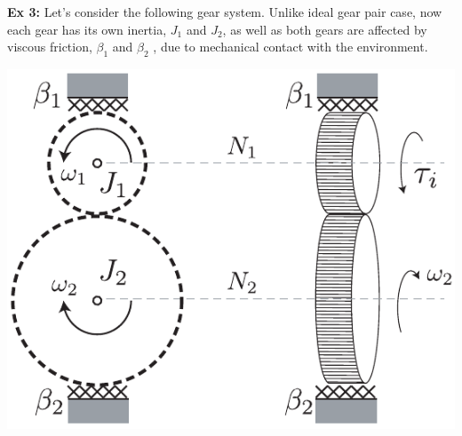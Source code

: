 \documentclass[twoside]{article}
\begin{document}
\vspace{12pt}

\textbf{Ex 3:} Let's consider the following gear system. Unlike ideal gear pair case, now each gear has its own inertia, $J_1$ and
$J_2$, as well as both gears are affected by viscous friction, $\beta_1$ and $\beta_2$ , due to mechanical contact with the environment. 

    \begin{center}
  \begin{minipage}[h]{0.75\linewidth}
    \begin{center}
      \includegraphics[width=1\textwidth]{ex2}
    \end{center}
  \end{minipage}
    \end{center}
\end{document}
